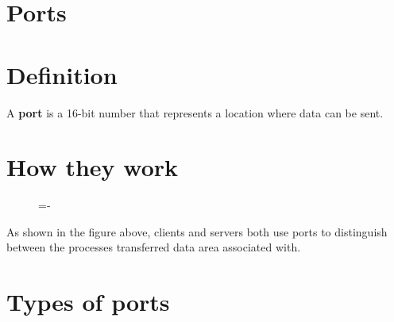 \documentclass[a4paper]{systems-software}
\begin{document}
\section{Ports}

\section*{Definition}

A \textbf{port} is a 16-bit number that represents a location where data can be sent.


\section*{How they work}

\begin{figure}[H]
	\lineskip=-\fboxrule
\end{figure}

As shown in the figure above, clients and servers both use ports to distinguish between the processes transferred data area associated with.


\section*{Types of ports}
\end{document}

